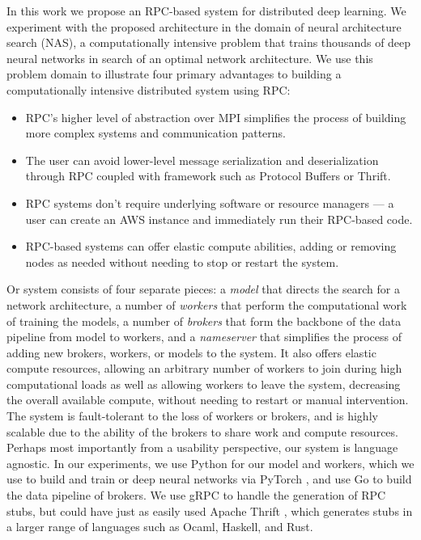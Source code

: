 \documentclass[conference]{IEEEtran}
\begin{document}
In this work we propose an RPC-based system for
distributed deep learning. We experiment with the proposed architecture in the domain
of neural architecture search (NAS), a computationally intensive problem that
trains thousands of deep neural networks in search of an optimal network architecture.
We use this problem domain to illustrate four primary advantages to building a
computationally intensive distributed system using RPC:
\begin{itemize}
\item RPC's higher level of abstraction over MPI simplifies the process of building more
  complex systems and communication patterns.
\item The user can avoid lower-level message serialization and deserialization through
  RPC coupled with framework such as Protocol Buffers or Thrift.
\item RPC systems don't require underlying software or resource managers --- a user can
  create an AWS instance and immediately run their RPC-based code.
\item RPC-based systems can offer elastic compute abilities, adding or removing nodes
  as needed without needing to stop or restart the system.
\end{itemize}
Or system consists of four separate pieces: a \emph{model} that directs the search
for a network architecture, a number of \emph{workers} that perform the computational
work of training the models, a number of \emph{brokers} that form the backbone of
the data pipeline from model to workers, and a \emph{nameserver} that simplifies the
process of adding new brokers, workers, or models to the system. It also offers
elastic compute resources, allowing an arbitrary number of workers to join during
high computational loads as well as allowing workers to leave the system, decreasing
the overall available compute, without needing to restart or manual intervention.
The system is fault-tolerant to the loss of workers or brokers, and is highly scalable
due to the ability of the brokers to share work and compute resources. Perhaps most
importantly from a usability perspective, our system is language agnostic. In our
experiments, we use Python for our model and workers, which we use to build and train
or deep neural networks via PyTorch \cite{paszke2017automatic}, and use Go to build
the data pipeline of brokers. We use gRPC \cite{Wang:1993:GCC:155870.155881} to handle
the generation of RPC stubs, but could have just as easily used Apache Thrift
\cite{Slee2007}, which generates stubs in a larger range of languages such as Ocaml,
Haskell, and Rust.
\end{document}
